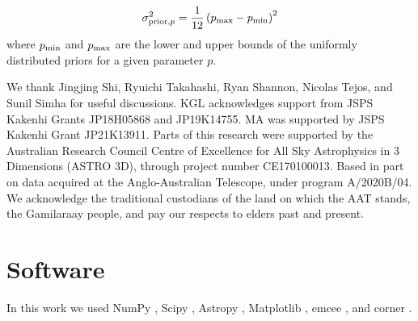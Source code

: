 \documentclass[twocolumn]{aastex63}
\begin{document}
\begin{CJK*}{UTF8}{gbsn}
\begin{equation}
    \sigma^2_{{\rm prior}, p} = \frac{1}{12}\left( p_{\rm max} - p_{\rm min}\right)^2
\end{equation}
where $p_{\rm min}$ and $p_{\rm max}$ are the lower and upper bounds of the uniformly distributed priors for a given parameter $p$.

\begin{acknowledgements}

We thank Jingjing Shi, Ryuichi Takahashi, Ryan Shannon, Nicolas Tejos, and Sunil Simha for useful discussions.
KGL acknowledges support from JSPS Kakenhi Grants JP18H05868 and JP19K14755.
MA was supported by JSPS Kakenhi Grant JP21K13911. Parts of this research were supported by the Australian Research Council Centre of Excellence for All Sky Astrophysics in 3 Dimensions (ASTRO 3D), through project number CE170100013.
Based in part on data acquired at the Anglo-Australian Telescope, under program A/2020B/04. We acknowledge the traditional custodians of the land on which the AAT stands, the Gamilaraay people, and pay our respects to elders past and present.
\end{acknowledgements}

\section*{Software}
In this work we used  NumPy \citep{harris:2020}, Scipy \citep{virtanen:2020}, Astropy \citep{astropy-collaboration:2013,astropy-collaboration:2018},
 Matplotlib \citep{hunter:2007}, emcee \citep{foreman-mackey:2019}, and corner \citep{foreman-mackey:2016}.





\end{CJK*}
\end{document}
